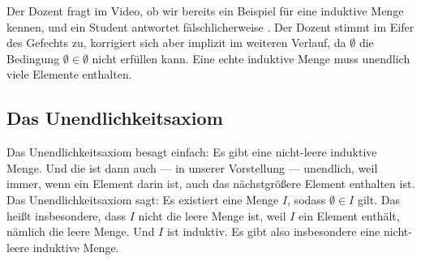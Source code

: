\begin{math-stroke}


\end{math-stroke}

\begin{ai-note}
Der Dozent fragt im Video, ob wir bereits ein Beispiel für eine induktive Menge kennen, und ein Student antwortet fälschlicherweise . Der Dozent stimmt im Eifer des Gefechts zu, korrigiert sich aber implizit im weiteren Verlauf, da $\emptyset$ die Bedingung $\emptyset \in \emptyset$ nicht erfüllen kann. Eine echte induktive Menge muss unendlich viele Elemente enthalten.
\end{ai-note}

\subsection{Das Unendlichkeitsaxiom}
\begin{spoken-clean}[00:22:54 - 00:25:03]
Das Unendlichkeitsaxiom besagt einfach: Es gibt eine nicht-leere induktive Menge. Und die ist dann auch --- in unserer Vorstellung --- unendlich, weil immer, wenn ein Element darin ist, auch das nächstgrößere Element enthalten ist. Das Unendlichkeitsaxiom sagt: Es existiert eine Menge $I$, sodass $\emptyset \in I$ gilt. Das heißt insbesondere, dass $I$ nicht die leere Menge ist, weil $I$ ein Element enthält, nämlich die leere Menge. Und $I$ ist induktiv. Es gibt also insbesondere eine nicht-leere induktive Menge.
\end{spoken-clean}

